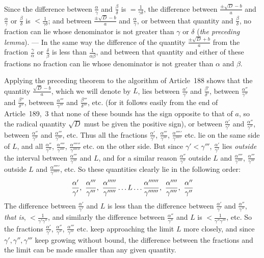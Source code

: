 Since the difference between $\frac{\alpha}{\gamma}$ and $\frac{\beta}{\delta}$ is $=\frac{1}{\gamma\delta}$, the difference between $\frac{\pm\surd D-b}{a}$ and $\frac{\alpha}{\gamma}$ or $\frac{\beta}{\delta}$ is $<\frac{1}{\gamma\delta}$; and between $\frac{\pm\surd D-b}{a}$ and $\frac{\alpha}{\gamma}$, or between that quantity and $\frac{\beta}{\delta}$, no fraction can lie whose denominator is not greater than $\gamma$ or $\delta$ (\textit{the preceding lemma}). --- In the same way the difference of the quantity ${\frac{\pm\surd D+b}{a}}$ from the fraction $\frac{\gamma}{\alpha}$ or $\frac{\delta}{\beta}$
is less than $\frac{1}{\alpha\beta}$, and between that quantity and either of these fractions no fraction can lie whose denominator is not greater than $\alpha$ and $\beta$.

Applying the preceding theorem to the algorithm of Article~188 shows that the quantity $\frac{\surd D-b}{a}$, which we will denote by $L$, lies between $\frac{\alpha'}{\gamma'}$ and $\frac{\beta'}{\delta'}$, between $\frac{\alpha''}{\gamma''}$ and $\frac{\beta''}{\delta''}$, between $\frac{\alpha'''}{\gamma'''}$ and $\frac{\beta'''}{\delta'''}$, etc. (for it follows easily from the end of Article~189,~3 that none of these bounds has the sign opposite to that of $a$, so the radical quantity $\surd D$ must be given the positive sign), or between $\frac{\alpha'}{\gamma'}$ and $\frac{\alpha''}{\gamma''}$, between $\frac{\alpha''}{\gamma''}$ and $\frac{\alpha'''}{\gamma'''}$, etc. Thus all the fractions $\frac{\alpha'}{\gamma'}$, $\frac{\alpha'''}{\gamma'''}$, $\frac{\alpha'''''}{\gamma'''''}$ etc. lie on the same side of $L$, and all $\frac{\alpha''}{\gamma''}$, $\frac{\alpha''''}{\gamma''''}$, $\frac{\alpha''''''}{\gamma''''''}$ etc. on the other side. But since $\gamma'<\gamma'''$, $\frac{\alpha'}{\gamma'}$ lies \textit{outside} the interval between $\frac{\alpha'''}{\gamma'''}$ and $L$, and for a similar reason $\frac{\alpha''}{\gamma''}$ outside $L$ and $\frac{\alpha''''}{\gamma''''}$, $\frac{\alpha'''}{\gamma'''}$ outside $L$ and $\frac{\alpha'''''}{\gamma'''''}$, etc. So these quantities clearly lie in the following order:
\[
\frac{\alpha'}{\gamma'},\ \frac{\alpha'''}{\gamma'''},\ \frac{\alpha'''''}{\gamma'''''}\mathinner{\ldotp\ldotp\ldotp} L\mathinner{\ldotp\ldotp\ldotp}\frac{\alpha''''''}{\gamma''''''},\ \frac{\alpha''''}{\gamma''''},\ \frac{\alpha''}{\gamma''}
\]
The difference between $\frac{\alpha'}{\gamma'}$ and $L$ is less than the difference between $\frac{\alpha'}{\gamma'}$ and $\frac{\alpha''}{\gamma''}$, \textit{that is}, $<\frac{1}{\gamma'\gamma''}$, and similarly the difference between $\frac{\alpha''}{\gamma''}$ and $L$ is $<\frac{1}{\gamma''\gamma'''}$, etc. So the fractions $\frac{\alpha'}{\gamma'}$, $\frac{\alpha''}{\gamma''}$, $\frac{\alpha'''}{\gamma'''}$ etc. keep approaching the limit $L$ more closely, and since $\gamma',\gamma'',\gamma'''$ keep growing without bound, the difference between the fractions and the limit can be made smaller than any given quantity.

